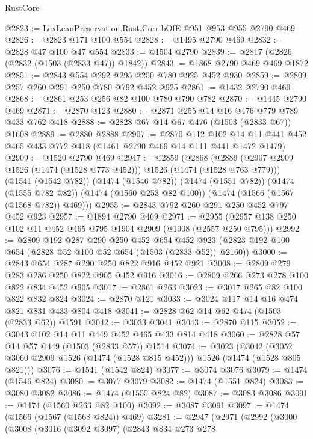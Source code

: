 \begin{lexlean}{RustCore}
\begin{coremodule}
@2823 := LexLeanPreservation.Rust.Corr.bOfE @951 @953 @955 @2790 @469
@2826 := @2823 @171 @100 @554
@2828 := @1495 @2790 @469
@2832 := @2828 @47 @100 @47 @554
@2833 := @1504 @2790
@2839 := @2817 (@2826 (@2832 (@1503 (@2833 @47)) @1842))
@2843 := @1868 @2790 @469 @469 @1872
@2851 := @2843 @554 @292 @295 @250 @780 @925 @452 @930
@2859 := @2809 @257 @260 @291 @250 @780 @792 @452 @925
@2861 := @1432 @2790 @469
@2868 := @2861 @253 @256 @82 @100 @780 @790 @782
@2870 := @1445 @2790 @469
@2871 := @2870 @123
@2880 := @2871 @255 @14 @16 @476 @779 @789 @433 @762 @418
@2888 := @2828 @67 @14 @67 @476 (@1503 (@2833 @67)) @1608
@2889 := @2880 @2888
@2907 := @2870
    @112
    @102
    @14
    @11
    @441
    @452
    @465
    @433
    @772
    @418
    (@1461 @2790 @469 @14 @111 @441 @1472 @1479)
@2909 := @1520 @2790 @469
@2947 := @2859
    (@2868
      (@2889 (@2907 @2909 @1526 (@1474 (@1528 @773 @452))) @1526 (@1474 (@1528 @763 @779)))
      (@1541 (@1542 @782))
      (@1474 (@1546 @782))
      (@1474 (@1551 @782))
      (@1474 (@1555 @782 @82))
      (@1474 (@1560 @253 @82 @100))
      (@1474 (@1566 (@1567 (@1568 @782)) @469)))
@2955 := @2843 @792 @260 @291 @250 @452 @797 @452 @923
@2957 := @1894 @2790 @469
@2971 := @2955 (@2957 @138 @250 @102 @11 @452 @465 @795 @1904 @2909 (@1908 (@2557 @250 @795)))
@2992 := @2809
    @192
    @287
    @290
    @250
    @452
    @654
    @452
    @923
    (@2823 @192 @100 @654 (@2828 @52 @100 @52 @654 (@1503 (@2833 @52)) @2160))
@3000 := @2843 @654 @287 @290 @250 @822 @916 @452 @921
@3008 := @2809 @279 @283 @286 @250 @822 @905 @452 @916
@3016 := @2809 @266 @273 @278 @100 @822 @834 @452 @905
@3017 := @2861 @263
@3023 := @3017 @265 @82 @100 @822 @832 @824
@3024 := @2870 @121
@3033 := @3024 @117 @14 @16 @474 @821 @831 @433 @804 @418
@3041 := @2828 @62 @14 @62 @474 (@1503 (@2833 @62)) @1591
@3042 := @3033 @3041
@3043 := @2870 @115
@3052 := @3043 @102 @14 @11 @449 @452 @465 @433 @814 @418
@3060 := @2828 @57 @14 @57 @449 (@1503 (@2833 @57)) @1514
@3074 := @3023
    (@3042 (@3052 @3060 @2909 @1526 (@1474 (@1528 @815 @452))) @1526 (@1474 (@1528 @805 @821)))
@3076 := @1541 (@1542 @824)
@3077 := @3074 @3076
@3079 := @1474 (@1546 @824)
@3080 := @3077 @3079
@3082 := @1474 (@1551 @824)
@3083 := @3080 @3082
@3086 := @1474 (@1555 @824 @82)
@3087 := @3083 @3086
@3091 := @1474 (@1560 @263 @82 @100)
@3092 := @3087 @3091
@3097 := @1474 (@1566 (@1567 (@1568 @824)) @469)
@3281 := @2947
    (@2971
      (@2992
        (@3000
          (@3008
            (@3016
              (@3092 @3097)
              (@2843
                @834
                @273
                @278

\end{coremodule}
\end{lexlean}
